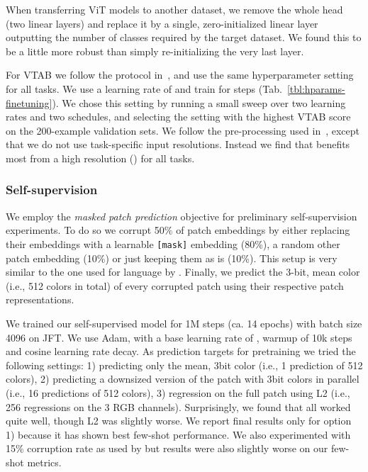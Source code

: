 When transferring ViT models to another dataset, we remove the whole head (two linear layers) and replace it by a single, zero-initialized linear layer outputting the number of classes required by the target dataset.
We found this to be a little more robust than simply re-initializing the very last layer.

For VTAB we follow the protocol in~\citet{kolesnikov2020-bit}, and use the same hyperparameter setting for all tasks.
We use a learning rate of  and train for  steps (Tab.~\ref{tbl:hparams-finetuning}).
We chose this setting by running a small sweep over two learning rates and two schedules, and selecting the setting with the highest VTAB score on the 200-example validation sets.
We follow the pre-processing used in~\cite{kolesnikov2020-bit}, except that we do not use task-specific input resolutions.
Instead we find that \oursfull{} benefits most from a high resolution () for all tasks.

\subsubsection{Self-supervision}\label{sec:self_supervision}

We employ the \textit{masked patch prediction} objective for preliminary self-supervision experiments. To do so we corrupt 50\% of patch embeddings by either replacing their embeddings with a learnable \verb|[mask]| embedding (80\%), a random other patch embedding (10\%) or just keeping them as is (10\%). This setup is very similar to the one used for language by \citet{devlin19-bert}. Finally, we predict the 3-bit, mean color (i.e., 512 colors in total) of every corrupted patch using their respective patch representations.

We trained our self-supervised model for 1M steps (ca. 14 epochs) with batch size 4096 on JFT. We use Adam, with a base learning rate of , warmup of 10k steps and cosine learning rate decay. As prediction targets for pretraining we tried the following settings: 1) predicting only the mean, 3bit color (i.e., 1 prediction of 512 colors), 2) predicting a  downsized version of the  patch with 3bit colors in parallel (i.e., 16 predictions of 512 colors), 3) regression on the full patch using L2 (i.e., 256 regressions on the 3 RGB channels). Surprisingly, we found that all worked quite well, though L2 was slightly worse. We report final results only for option 1) because it has shown best few-shot performance. We also experimented with 15\% corruption rate as used by \citet{devlin19-bert} but results were also slightly worse on our few-shot metrics.

